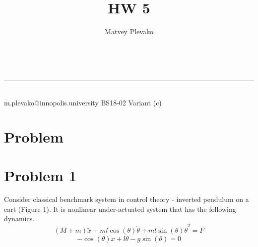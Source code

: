 \documentclass[a4paper,11pt]{article}
\makeatletter
\newcommand{\linia}{\rule{\linewidth}{0.5pt}}
\theoremstyle{mytheor}
\renewcommand{\maketitle}{
\begin{center}
\vspace{2ex}
{\huge \textsc{\@title}}
\vspace{1ex}
\\
\linia\\
\@author \hspace{100ex} m.plevako@innopolis.university \hspace{100ex} BS18-02 \hspace{100ex} Variant (c)

\vspace{4ex}
\end{center}
}
\makeatother
\begin{document}
\title{HW \textnumero{} 5}

\author{Matvey Plevako}

\maketitle


\section*{Problem}

% 


\section*{Problem 1}
Consider classical benchmark system in control theory - inverted pendulum on a cart (Figure 1). It is nonlinear under-actuated system that has the following dynamics.
  $$(M + m)\ddot{x} - ml \cos(\theta) \ddot{\theta}+ ml \sin(\theta) \dot{\theta}^2 = F$$
$$- \cos(\theta)\ddot{x} + l\ddot{\theta}- g \sin(\theta) = 0$$
\end{document}
